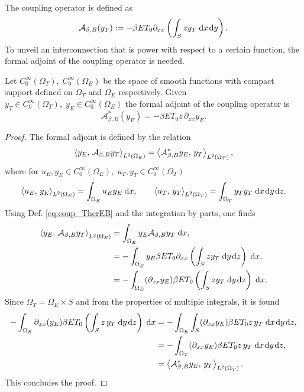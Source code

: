 The coupling operator is defined as
\begin{equation}\label{eq:coup_TherEB}
	\mathcal{A}_{\beta, B}(y_T) := - \beta E T_0 \partial_{xx} \left(\int_S z y_T \d{x}\d{y}\right).
\end{equation}
To unveil an interconnection that is power with respect to a certain function, the formal adjoint of the coupling operator is needed.
\begin{proposition}\label{prop:adjcoup_TherEB}
	Let $C_0^{\infty}(\Omega_T), \; C_0^{\infty}(\Omega_E)$ be the space of smooth functions with compact support defined on $\Omega_T$ and $\Omega_E$ respectively. Given $y_T \in C_0^{\infty}(\Omega_T), \; y_E \in C_0^{\infty}(\Omega_E)$ the formal adjoint of the coupling operator is 
	\begin{equation}\label{eq:adjcoup_TherEB}
		\mathcal{A}_{\beta, B}^*(y_E) = -\beta E T_0 z \, \partial_{xx} y_E.
	\end{equation}
	\begin{proof}
		The formal adjoint is defined by the relation
		\begin{equation}
		\inner[L^2(\Omega_E)]{y_E}{\mathcal{A}_{\beta, B}y_T}= \inner[L^2(\Omega_T)]{\mathcal{A}_{\beta, B}^* y_E}{y_T},
		\end{equation}
		where for $u_E, y_E \in C_0^{\infty}(\Omega_E), \; u_T, y_T \in C_0^{\infty}(\Omega_T)$
		\begin{equation}
		\inner[L^2(\Omega_E)]{u_E}{y_E} = \int_{\Omega_E} u_E y_E \d{x}, \qquad \inner[L^2(\Omega_T)]{u_T}{y_T} = \int_{\Omega_T} y_T y_T \d{x}\d{y}\d{z}.
		\end{equation}
		Using Def. \eqref{eq:coup_TherEB} and the integration by parts, one finds
		\begin{equation}
		\begin{aligned}
		\inner[L^2(\Omega_E)]{y_E}{\mathcal{A}_{\beta, B}y_T}&=\int_{\Omega_E} y_E \mathcal{A}_{\beta, B}y_T \d{x}, \\
		&= -\int_{\Omega_E} y_E \beta E T_0 \partial_{xx} \left(\int_S z y_T \d{y}\d{z}\right) \d{x}, \\
		&= -\int_{\Omega_E} (\partial_{xx} y_E) \beta E T_0 \left(\int_S z y_T \d{y}\d{z}\right) \d{x}, \\
		\end{aligned}
		\end{equation}
		Since $\Omega_T = \Omega_E \times S$ and from the properties of multiple integrals, it is found
		\begin{equation}
		\begin{aligned}
		-\int_{\Omega_E} \partial_{xx} (y_E) \beta E T_0 \left(\int_S z\, y_T \d{y}\d{z}\right) \d{x} &= -\int_{\Omega_E}\int_S  (\partial_{xx} y_E) \beta E T_0 z \, y_T \d{x}\d{y}\d{z}, \\
		&= -\int_{\Omega_T}(\partial_{xx} y_E) \beta E T_0 z \, y_T \d{x}\d{y}\d{z}, \\
		&=	\inner[L^2(\Omega_T)]{\mathcal{A}_{\beta, B}^* y_E}{y_T}.
		\end{aligned}
		\end{equation}
		This concludes the proof.
	\end{proof}
\end{proposition}

